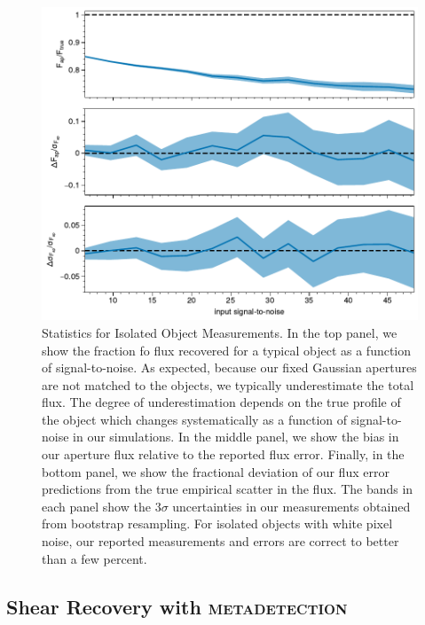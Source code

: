 \documentclass[twocolappendix, appendixfloats, numberedappendix, twocolumn, apj]{openjournal}
\newcommand{\mdet}{\textsc{metadetection}\xspace}
\begin{document}
\begin{figure}
    \includegraphics[width=\columnwidth]{figures/test-noround-nodetect.pdf}

    \caption{
      Statistics for Isolated Object Measurements. In the top panel, we show the
      fraction fo flux recovered for a typical object as a function of signal-to-noise.
      As expected, because our fixed Gaussian apertures are not matched to the objects,
      we typically underestimate the total flux. The degree of underestimation depends on
      the true profile of the object which changes systematically as a function of
      signal-to-noise in our simulations. In the middle panel, we show the bias in
      our aperture flux relative to the reported flux error. Finally, in the bottom panel,
      we show the fractional deviation of our flux error predictions from the true
      empirical scatter in the flux. The bands in each panel show the $3\sigma$ uncertainties
      in our measurements obtained from bootstrap resampling. For isolated objects
      with white pixel noise, our reported measurements and errors are correct to
      better than a few percent.
      \label{fig:noround_nodetect}
    }

\end{figure}


\subsection{Shear Recovery with \mdet}
\end{document}
